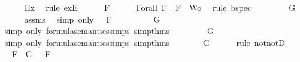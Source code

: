 \begin{isabellebody}
\ \ \ \ \isamarkupfalse%
\ Ex{}\ \isamarkupfalse%
\ {\isacharparenleft}rule\ exE{\isacharparenright}\isanewline
\ \ \isamarkupfalse%
\ {\isachardoublequoteopen}{\isasymA}\ {\isasymTurnstile}\ F{\isachardoublequoteclose}\isanewline
\ \ \ \ \isamarkupfalse%
\ Forall{}\ {\isacartoucheopen}F\ {\isasymin}\ {\isacharbraceleft}F{\isacharbraceright}\ {\isasymunion}\ Wo{\isacartoucheclose}\ \isamarkupfalse%
\ {\isacharparenleft}rule\ bspec{\isacharparenright}\isanewline
\ \ \isamarkupfalse%
\ \isamarkupfalse%
\ {\isachardoublequoteopen}{\isasymA}\ {\isasymTurnstile}\ \isactrlbold {\isasymnot}{\isacharparenleft}\isactrlbold {\isasymnot}\ G{\isacharparenright}{\isachardoublequoteclose}\isanewline
\ \ \ \ \isamarkupfalse%
\ assms{\isacharparenleft}{}{\isacharparenright}\ \isamarkupfalse%
\ {\isacharparenleft}simp\ only{\isacharcolon}\ {\isacartoucheopen}{\isasymA}\ {\isasymTurnstile}\ F{\isacartoucheclose}{\isacharparenright}\isanewline
\ \ \isamarkupfalse%
\ \isamarkupfalse%
\ {\isachardoublequoteopen}{\isasymnot}\ {\isasymA}\ {\isasymTurnstile}\ \isactrlbold {\isasymnot}\ G{\isachardoublequoteclose}\isanewline
\ \ \ \ \isamarkupfalse%
\ {\isacharparenleft}simp\ only{\isacharcolon}\ formula{\isacharunderscore}semantics{\isachardot}simps{\isacharparenleft}{}{\isacharparenright}\ simp{\isacharunderscore}thms{\isacharparenleft}{}{\isacharparenright}{\isacharparenright}\isanewline
\ \ \isamarkupfalse%
\ \isamarkupfalse%
\ {\isachardoublequoteopen}{\isasymnot}\ {\isasymnot}{\isasymA}\ {\isasymTurnstile}\ G{\isachardoublequoteclose}\isanewline
\ \ \ \ \isamarkupfalse%
\ {\isacharparenleft}simp\ only{\isacharcolon}\ formula{\isacharunderscore}semantics{\isachardot}simps{\isacharparenleft}{}{\isacharparenright}\ simp{\isacharunderscore}thms{\isacharparenleft}{}{\isacharparenright}{\isacharparenright}\isanewline
\ \ \isamarkupfalse%
\ \isamarkupfalse%
\ {\isachardoublequoteopen}{\isasymA}\ {\isasymTurnstile}\ G{\isachardoublequoteclose}\isanewline
\ \ \ \ \isamarkupfalse%
\ {\isacharparenleft}rule\ notnotD{\isacharparenright}\isanewline
\ \ \isamarkupfalse%
\ \isamarkupfalse%
\ {}{\isacharcolon}{\isachardoublequoteopen}{\isasymforall}F\ {\isasymin}\ {\isacharbraceleft}G{\isacharbraceright}{\isachardot}\ {\isasymA}\ {\isasymTurnstile}\ F{\isachardoublequoteclose}\isanewline

\end{isabellebody}
